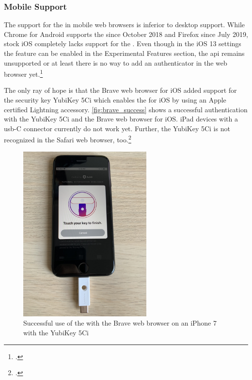 \subsubsection{Mobile Support}

The support for the \wa{} in mobile web browsers is inferior to desktop support. While Chrome for Android supports the \wa{} since October 2018 and Firefox since July 2019, stock iOS completely lacks support for the \wa. Even though in the iOS 13 settings the feature can be enabled in the \frqq Experimental Features\flqq{} section, the \gls{api} remains unsupported or at least there is no way to add an authenticator in the web browser yet.\footcites[See][]{chrome-android-webauthn}[See]{firefox-android-webauthn}

The only ray of hope is that the Brave web browser for iOS added support for the security key \frqq YubiKey 5Ci\flqq{} which enables the \wa{} for iOS by using an Apple certified Lightning accessory. \autoref{fig:brave_success} shows a successful authentication with the YubiKey 5Ci and the Brave web browser for iOS. iPad devices with a \gls{usb}-C connector currently do not work yet. Further, the YubiKey 5Ci is not recognized in the Safari web browser, too.\footcites[See][]{brave-ios}[See][]{brave-now-available}[See][]{fido-ct-6}

\begin{figure}[hbt]
	\centering
	\includegraphics[width=0.6\textwidth]{pics/brave_success_5ci.eps}
	\caption[Successful use of the \wa{} with the Brave web browser on an iPhone 7 with the YubiKey 5Ci]{Successful use of the \wa{} with the Brave web browser on an iPhone 7 with the YubiKey 5Ci\footnotemark}
	\label{fig:brave_success}
\end{figure}

